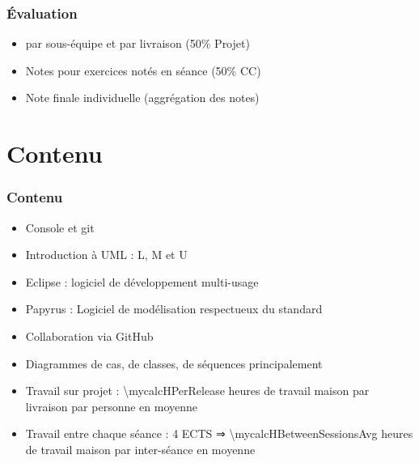 \documentclass[french]{beamer}
\begin{document}
\begin{frame}
	\frametitle{Évaluation}
	\begin{itemize}
		\item {} par sous-équipe et par livraison (50\% Projet)
		\item Notes pour exercices notés en séance (50\% CC)
		\item Note finale individuelle (aggrégation des notes)
	\end{itemize}
\end{frame}

\section{Contenu}
\begin{frame}
	\frametitle{Contenu}
	\begin{itemize}
		\item Console et git
		\item Introduction à UML : L, M et U
		\item Eclipse : logiciel de développement multi-usage
		\item Papyrus : Logiciel de modélisation respectueux du standard
		\item Collaboration via GitHub
		\item Diagrammes de cas, de classes, de séquences principalement
		\item Travail sur projet : \num{\mycalcHPerRelease} heures de travail maison par livraison par personne en moyenne
		\item Travail entre chaque séance : 4 ECTS ⇒ \num[round-mode=places, round-precision=0, mode=text]{\mycalcHBetweenSessionsAvg} heures de travail maison par inter-séance en moyenne
	\end{itemize}
\end{frame}
\end{document}
